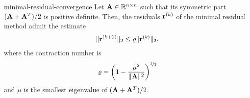 \begin{Theorem}{minimal-residual-convergence}
  Let $\mathbf A\in\mathbb R^{n\times n}$ such that its symmetric part $(\mathbf A+\mathbf A^T)/2$
  is positive definite. Then, the residuals $\mathbf r^{(k)}$ of the minimal
  residual method admit the estimate
  \begin{gather}
    \lVert\mathbf r^{(k+1)}\rVert_2 \le \varrho \lVert\mathbf r^{(k)}\rVert_2,
  \end{gather}
  where the contraction number is
  \begin{gather}
    \varrho = \left(1-\frac{\mu^2}{\lVert\mathbf A\rVert^2}\right)^{\nicefrac12}
  \end{gather}
  and $\mu$ is the smallest eigenvalue of $(\mathbf A+\mathbf A^T)/2$.
\end{Theorem}




